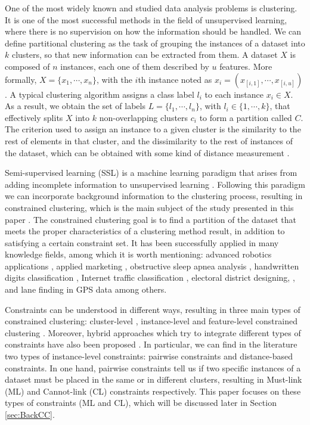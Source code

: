 \documentclass[review]{elsarticle}
\begin{document}
One of the most widely known and studied data analysis problems is clustering. It is one of the most successful methods in the field of unsupervised learning, where there is no supervision on how the information should be handled. We can define partitional clustering as the task of grouping the instances of a dataset into $k$ clusters, so that new information can be extracted from them. A dataset $X$ is composed of $n$ instances, each one of them described by $u$ features. More formally, $X = \{x_1, \cdots, x_n\}$, with the $i$th instance noted as $x_i = (x_{[i,1]}, \cdots, x_{[i,u]})$. A typical clustering algorithm assigns a class label $l_i$ to each instance $x_i \in X$. As a result, we obtain the set of labels $L = \{l_1, \cdots, l_n\}$, with $l_i \in \{1, \cdots, k\}$, that effectively splits $X$ into $k$ non-overlapping clusters $c_i$ to form a partition called $C$. The criterion used to assign an instance to a given cluster is the similarity to the rest of elements in that cluster, and the dissimilarity to the rest of instances of the dataset, which can be obtained with some kind of distance measurement \cite{jain1999data}.

Semi-supervised learning (SSL) is a machine learning paradigm that arises from adding incomplete information to unsupervised learning \cite{chapelle2009semi}. Following this paradigm we can incorporate background information to the clustering process, resulting in constrained clustering, which is the main subject of the study presented in this paper \cite{triguero2015self}. The constrained clustering goal is to find a partition of the dataset that meets the proper characteristics of a clustering method result, in addition to satisfying a certain constraint set. It has been successfully applied in many knowledge fields, among which it is worth mentioning: advanced robotics applications \cite{davidson2005clustering, semnani2016constrained}, applied marketing \cite{seret2014new}, obstructive sleep apnea analysis \cite{mai2018evolutionary}, handwritten digits classification \cite{li2015scalable}, Internet traffic classification \cite{wang2014internet}, electoral district designing, \cite{brieden2017constrained}, and lane finding in GPS data \cite{wagstaff2001constrained} among others.

Constraints can be understood in different ways, resulting in three main types of constrained clustering: cluster-level \cite{bradley2000constrained}, instance-level \cite{davidson2007survey} and feature-level constrained clustering \cite{schmidt2011clustering}. Moreover, hybrid approaches which try to integrate different types of constraints have also been proposed \cite{wang2010clustering}. In particular, we can find in the literature two types of instance-level constraints: pairwise constraints and distance-based constraints. In one hand, pairwise constraints tell us if two specific instances of a dataset must be placed in the same or in different clusters, resulting in Must-link (ML) and Cannot-link (CL) constraints respectively. This paper focuses on these types of constraints (ML and CL), which will be discussed later in Section \ref{sec:BackCC}.
\end{document}
